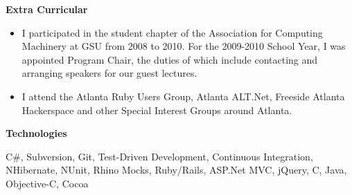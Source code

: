 \documentclass[11pt]{article}
\begin{document}
  {\large \textbf{Extra Curricular}}

  \begin{itemize}
    \item I participated in the student chapter of the Association for Computing Machinery at GSU from 2008 to 2010. For the 2009-2010 School Year, I was appointed Program Chair, the duties of which include contacting and arranging speakers for our guest lectures.
    \item I attend the Atlanta Ruby Users Group, Atlanta ALT.Net, Freeside Atlanta Hackerspace and other Special Interest Groups around Atlanta.
  \end{itemize}

  {\large \textbf{Technologies}}

  \begin{flushleft}
    \addtolength{\leftskip}{.3in} 
    C\#, Subversion, Git, Test-Driven Development, Continuous Integration, NHibernate, NUnit, 
    Rhino Mocks, Ruby/Rails, ASP.Net MVC, jQuery, C, Java, Objective-C, Cocoa
  \end{flushleft}
\end{document}
